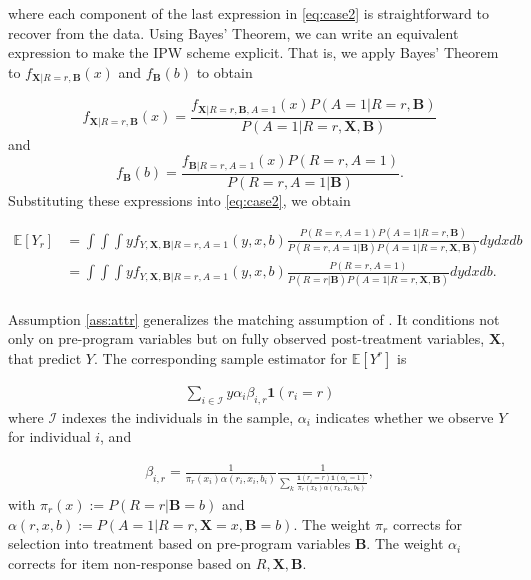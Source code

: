 \noindent where each component of the last expression in \eqref{eq:case2} is straightforward to recover from the data. Using Bayes' Theorem, we can write an equivalent expression to make the IPW scheme explicit. That is, we apply Bayes' Theorem to $f_{\bm{X} | R=r, \bm{B} }(x)$ and $f_{\bm{B}} (b)$ to obtain

\begin{equation*}
f_{\bm{X}|R=r,\bm{B}}(x) = \frac{f_{\bm{X}|R=r,\bm{B},A=1}(x) P(A=1|R=r,\bm{B})}{P(A=1|R=r,\bm{X},\bm{B})}
\end{equation*}
and
\begin{equation*}
	f_{\bm{B}} (b) = \frac{f_{\bm{B}|R=r,A=1} (x) P(R=r,A=1)}{P(R=r,A=1|\bm{B})}.
\end{equation*}
\noindent Substituting these expressions into \eqref{eq:case2}, we obtain

\begin{align*} \label{eq:case2ipw}
\mathbb{E}[Y_r] & = \int \int \int y f_{Y,\bm{X},\bm{B}|R=r,A=1}(y,x,b) \frac{P(R=r,A=1) P(A=1|R=r,\bm{B})}{P(R=r,A=1|\bm{B}) P(A=1|R=r,\bm{X},\bm{B})} dydxdb \\
	            & = \int \int  \int y f_{Y,\bm{X},\bm{B}|R=r,A=1}(y,x,b) \frac{P(R=r,A=1)}{P(R=r|\bm{B}) P(A=1|R=r,\bm{X},\bm{B})} dydxdb. \\
\end{align*}

\noindent Assumption \ref{ass:attr} generalizes the matching assumption of \citet{Campbell_Conti_etal_2014_EarlyChildhoodInvestments}. It conditions not only on pre-program variables but on fully observed post-treatment variables, $\bm{X}$, that predict $Y$. The corresponding sample estimator for $\mathbb{E}[Y^r]$ is

\begin{align*}
\sum_{i \in \mathcal{I}} y \alpha_{i} \beta_{i,r} \mathbf{1}(r_i = r)
\end{align*}
\noindent where $\mathcal{I}$ indexes the individuals in the sample, $\alpha_i$ indicates whether we observe $Y$ for individual $i$, and

\begin{align*}
	\beta_{i,r} = \frac{1}{\pi_r(x_i) \alpha(r_i,x_i,b_i)} \frac{1}{\sum_k{\frac{\mathbf{1}(r_i = r) \mathbf{1}(\alpha_i = 1)}{\pi_r(x_k)\alpha(r_k,x_k,b_k)}}},
\end{align*}
\noindent with $\pi_r(x) := P(R=r|\bm{B}=b)$ and $\alpha(r,x,b) := P(A=1|R=r,\bm{X}=x,\bm{B}=b)$. The weight $\pi_r$ corrects for selection into treatment based on pre-program variables $\bm{B}$. The weight $\alpha_{i}$ corrects for item non-response based on $R, \bm{X}, \bm{B}$.\\

